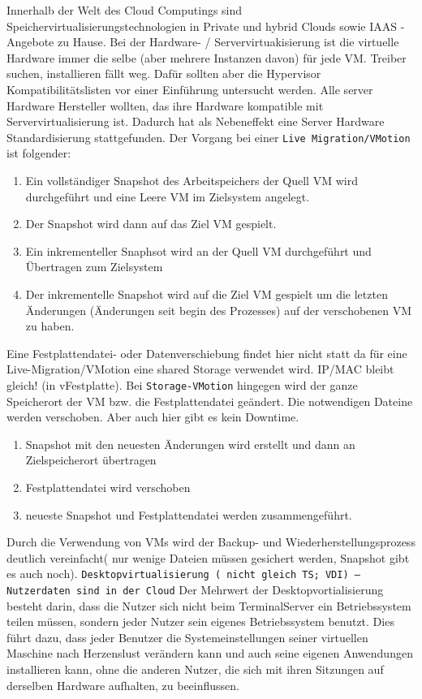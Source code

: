 \documentclass[a4paper,10pt]{article}
\begin{document}
Innerhalb der Welt des Cloud Computings sind Speichervirtualisierungstechnologien in Private und hybrid Clouds sowie IAAS - Angebote zu Hause.
\vspace{3mm}
Bei der Hardware- / Servervirtuakisierung ist die virtuelle Hardware immer die selbe (aber mehrere Instanzen davon) für jede VM. Treiber suchen, installieren fällt weg. Dafür sollten aber die Hypervisor Kompatibilitätslisten vor einer Einführung untersucht werden. \newline
Alle server Hardware Hersteller wollten, das ihre Hardware kompatible mit Servervirtualisierung ist. Dadurch hat als Nebeneffekt eine Server Hardware Standardisierung stattgefunden.
\vspace{3mm}
Der Vorgang bei einer \texttt{Live Migration/VMotion} ist folgender:
\begin{enumerate}
	\item Ein vollständiger Snapshot des Arbeitspeichers der Quell VM wird durchgeführt und eine Leere VM im Zielsystem angelegt.
	\item Der Snapshot wird dann auf das Ziel VM gespielt.
	\item Ein inkrementeller Snaphsot wird an der Quell VM durchgeführt und Übertragen zum Zielsystem
	\item Der inkrementelle Snapshot wird auf die Ziel VM gespielt um die letzten Änderungen (Änderungen seit  begin des Prozesses) auf der verschobenen VM zu haben.
\end{enumerate}
Eine Festplattendatei- oder Datenverschiebung findet hier nicht statt da für eine Live-Migration/VMotion eine shared Storage verwendet wird. IP/MAC bleibt gleich! (in vFestplatte). \newline
Bei \texttt{Storage-VMotion} hingegen wird der ganze Speicherort der VM bzw. die Festplattendatei geändert. Die notwendigen Dateine werden verschoben. Aber auch hier gibt es kein Downtime.
\begin{enumerate}
	\item Snapshot mit den neuesten Änderungen wird erstellt und dann an Zielspeicherort übertragen
	\item Festplattendatei wird verschoben
	\item neueste Snapshot und Festplattendatei werden zusammengeführt.
\end{enumerate}
Durch die Verwendung von VMs wird der Backup- und Wiederherstellungsprozess deutlich vereinfacht( nur wenige Dateien müssen gesichert werden, Snapshot gibt es auch noch).
\vspace{3mm}
\texttt{Desktopvirtualisierung ( nicht gleich TS; VDI) -- Nutzerdaten sind in der Cloud} \newline
Der Mehrwert der Desktopvortialisierung besteht darin, dass die Nutzer sich nicht beim TerminalServer ein Betriebssystem teilen müssen, sondern jeder Nutzer sein eigenes Betriebssystem benutzt. Dies führt dazu, dass jeder Benutzer die Systemeinstellungen seiner virtuellen Maschine nach Herzenslust verändern kann und auch seine eigenen Anwendungen installieren kann, ohne die anderen Nutzer, die sich mit ihren Sitzungen auf derselben Hardware aufhalten, zu beeinflussen.
\end{document}

